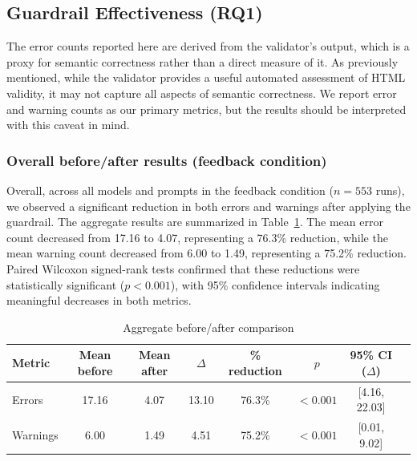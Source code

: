 \subsection{Guardrail Effectiveness (RQ1)}


The error counts reported here are derived from the validator's output, which is a proxy for semantic correctness rather than a direct measure of it. As previously mentioned, while the validator provides a useful automated assessment of HTML validity, it may not capture all aspects of semantic correctness. We report error and warning counts as our primary metrics, but the results should be interpreted with this caveat in mind.

\subsubsection{Overall before/after results (feedback condition)}


Overall, across all models and prompts in the feedback condition ($n=553$ runs), we observed a significant reduction in both errors and warnings after applying the guardrail. The aggregate results are summarized in Table~\ref{tab:rq1-aggregate}. The mean error count decreased from 17.16 to 4.07, representing a 76.3\% reduction, while the mean warning count decreased from 6.00 to 1.49, representing a 75.2\% reduction. Paired Wilcoxon signed-rank tests confirmed that these reductions were statistically significant ($p < 0.001$), with 95\% confidence intervals indicating meaningful decreases in both metrics.

\begin{table}[H]
	\centering
	\begin{tabular}{lccccccc}
		\toprule
		Metric   & Mean before & Mean after & $\Delta$ & \% reduction & $p$      & 95\% CI ($\Delta$) \\
		\midrule
		Errors   & 17.16       & 4.07       & 13.10    & 76.3\%       & $<0.001$ & [4.16, 22.03]      \\
		Warnings & 6.00        & 1.49       & 4.51     & 75.2\%       & $<0.001$ & [0.01, 9.02]       \\
		\bottomrule
	\end{tabular}
	\vspace{0.5em}
	\caption{Aggregate before/after comparison}
	\label{tab:rq1-aggregate}
\end{table}


